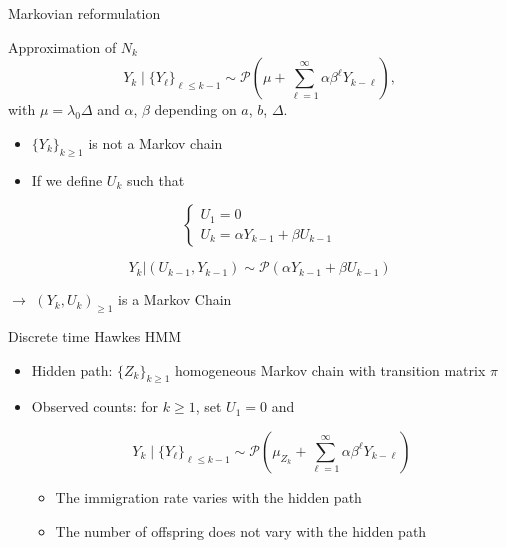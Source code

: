 \documentclass[french,english]{beamer}
\begin{document}
\begin{frame}{Markovian reformulation}

 \begin{block}{Approximation of $N_k$}
$$
Y_k \mid \{Y_\ell\}_{\ell \leq k-1} \sim \mathcal{P}\left(\mu + \sum_{\ell = 1}^{\infty} \alpha \beta^\ell Y_{k-\ell} \right),
$$
  with $\mu=\lambda_0 \Delta$ and $\alpha$, $\beta$ depending on $a$, $b$, $\Delta$.
   \end{block}
\begin{itemize}
    \item $\{Y_k\}_{k\geq 1}$ is not a Markov chain
    \item If we define $U_k$ such that 
  \end{itemize}  
  
  $$
 \left\{
 \begin{array}{l}
  U_1=0 \\
    U_k= \alpha Y_{k-1} + \beta U_{k-1}
 \end{array}
\right.
$$  
    
\begin{alertblock}{ }
$$Y_k \vert (U_{k-1}, Y_{k-1}) \sim  \mathcal{P}\left(\alpha Y_{k-1} +  \beta U_{k-1} \right)$$   
\end{alertblock}

$\rightarrow$ $(Y_k,U_k)_{\geq 1}$ is a Markov Chain    





\end{frame}

    
\begin{frame}{Discrete time Hawkes HMM}
\begin{itemize}
    \item Hidden path: $\{Z_k\}_{k \geq 1}$ homogeneous Markov chain with transition matrix $\pi$
    \item Observed counts: for $k\geq 1$, set $U_1=0$ and

    $$Y_k \mid \{Y_\ell\}_{\ell \leq k-1} \sim \mathcal{P}\left(\mu_{Z_k} + \sum_{\ell = 1}^{\infty} \alpha \beta^\ell Y_{k-\ell} \right)$$

    \begin{itemize}
        \item The immigration rate varies with the hidden path
        \item The number of offspring does not vary with the hidden path
    
    \end{itemize}
\end{itemize}

\footnotesize
\begin{figure}
   \begin{centering}

\end{centering}
\end{figure}

\end{frame}
\end{document}
